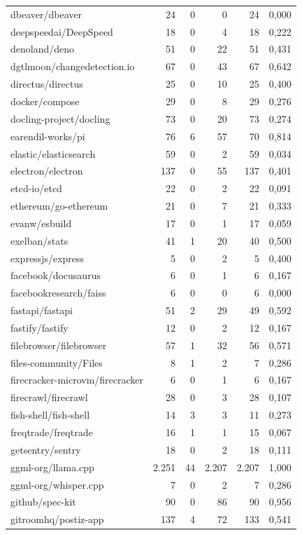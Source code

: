 \begin{tabular}{lrrrrr}
dbeaver/dbeaver & 24 & 0 & 0 & 24 & 0,000 \\
deepspeedai/DeepSpeed & 18 & 0 & 4 & 18 & 0,222 \\
denoland/deno & 51 & 0 & 22 & 51 & 0,431 \\
dgtlmoon/changedetection.io & 67 & 0 & 43 & 67 & 0,642 \\
directus/directus & 25 & 0 & 10 & 25 & 0,400 \\
docker/compose & 29 & 0 & 8 & 29 & 0,276 \\
docling-project/docling & 73 & 0 & 20 & 73 & 0,274 \\
earendil-works/pi & 76 & 6 & 57 & 70 & 0,814 \\
elastic/elasticsearch & 59 & 0 & 2 & 59 & 0,034 \\
electron/electron & 137 & 0 & 55 & 137 & 0,401 \\
etcd-io/etcd & 22 & 0 & 2 & 22 & 0,091 \\
ethereum/go-ethereum & 21 & 0 & 7 & 21 & 0,333 \\
evanw/esbuild & 17 & 0 & 1 & 17 & 0,059 \\
exelban/stats & 41 & 1 & 20 & 40 & 0,500 \\
expressjs/express & 5 & 0 & 2 & 5 & 0,400 \\
facebook/docusaurus & 6 & 0 & 1 & 6 & 0,167 \\
facebookresearch/faiss & 6 & 0 & 0 & 6 & 0,000 \\
fastapi/fastapi & 51 & 2 & 29 & 49 & 0,592 \\
fastify/fastify & 12 & 0 & 2 & 12 & 0,167 \\
filebrowser/filebrowser & 57 & 1 & 32 & 56 & 0,571 \\
files-community/Files & 8 & 1 & 2 & 7 & 0,286 \\
firecracker-microvm/firecracker & 6 & 0 & 1 & 6 & 0,167 \\
firecrawl/firecrawl & 28 & 0 & 3 & 28 & 0,107 \\
fish-shell/fish-shell & 14 & 3 & 3 & 11 & 0,273 \\
freqtrade/freqtrade & 16 & 1 & 1 & 15 & 0,067 \\
getsentry/sentry & 18 & 0 & 2 & 18 & 0,111 \\
ggml-org/llama.cpp & 2.251 & 44 & 2.207 & 2.207 & 1,000 \\
ggml-org/whisper.cpp & 7 & 0 & 2 & 7 & 0,286 \\
github/spec-kit & 90 & 0 & 86 & 90 & 0,956 \\
gitroomhq/postiz-app & 137 & 4 & 72 & 133 & 0,541 \\

\end{tabular}
